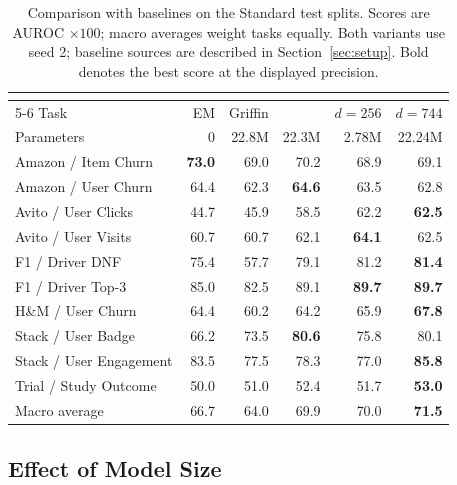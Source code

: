 \begin{table}[t]
\centering
\caption{Comparison with baselines on the Standard test splits. Scores are
AUROC $\times100$; macro averages weight tasks equally. Both \model{}
variants use seed 2; baseline sources are described in Section~\ref{sec:setup}.
Bold denotes the best score at the displayed precision.}
\label{tab:standard}
\small
\setlength{\tabcolsep}{4pt}
\begin{tabular}{lrrrrr}
\toprule
& & & & \multicolumn{2}{c}{\model{}} \\
\cmidrule(lr){5-6}
Task & EM & Griffin & \RT{} & $d=256$ & $d=744$ \\
\midrule
Parameters & 0 & 22.8M & 22.3M & 2.78M & 22.24M \\
\midrule
Amazon / Item Churn & \textbf{73.0} & 69.0 & 70.2 & 68.9 & 69.1 \\
Amazon / User Churn & 64.4 & 62.3 & \textbf{64.6} & 63.5 & 62.8 \\
Avito / User Clicks & 44.7 & 45.9 & 58.5 & 62.2 & \textbf{62.5} \\
Avito / User Visits & 60.7 & 60.7 & 62.1 & \textbf{64.1} & 62.5 \\
F1 / Driver DNF & 75.4 & 57.7 & 79.1 & 81.2 & \textbf{81.4} \\
F1 / Driver Top-3 & 85.0 & 82.5 & 89.1 & \textbf{89.7} & \textbf{89.7} \\
H\&M / User Churn & 64.4 & 60.2 & 64.2 & 65.9 & \textbf{67.8} \\
Stack / User Badge & 66.2 & 73.5 & \textbf{80.6} & 75.8 & 80.1 \\
Stack / User Engagement & 83.5 & 77.5 & 78.3 & 77.0 & \textbf{85.8} \\
Trial / Study Outcome & 50.0 & 51.0 & 52.4 & 51.7 & \textbf{53.0} \\
\midrule
Macro average & 66.7 & 64.0 & 69.9 & 70.0 & \textbf{71.5} \\
\bottomrule
\end{tabular}
\end{table}

\subsection{Effect of Model Size}
\label{sec:model_size}

